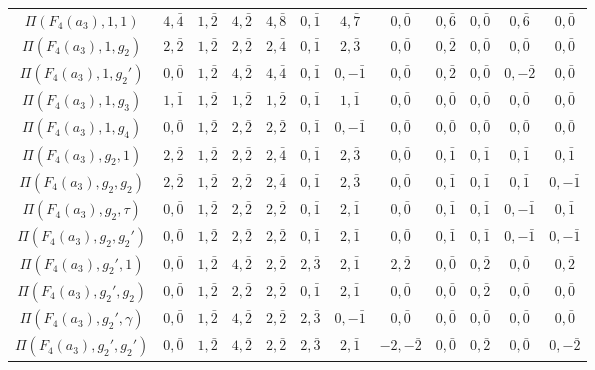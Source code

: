 \begin{table}[!ht]
\begin{adjustbox}{max width=\linewidth}
\begin{tabular}{|c|ccc|cccc|cccc|}
        $\Pi(F_4(a_3),1,1)$ & $4,\bar{4}$ & $1,\bar2$ & $4,\bar2$ & $4,\bar{8}$ & $0,\bar1$ & $4,\bar{7}$ & $0,\bar0$ & $0,\bar{6}$ & $0,\bar0$ & $0,\bar{6}$ & $0,\bar0$\\
        $\Pi(F_4(a_3),1,g_2)$ & $2,\bar2$ & $1,\bar2$ & $2,\bar2$ & $2,\bar{4}$ & $0,\bar1$ & $2,\bar{3}$ & $0,\bar0$ & $0,\bar2$ & $0,\bar0$ & $0,\bar0$ & $0,\bar0$ \\
        $\Pi(F_4(a_3),1,g_2')$ & $0,\bar0$ & $1,\bar2$ & $4,\bar2$ & $4,\bar{4}$ & $0,\bar1$ & $0,-\bar1$ & $0,\bar0$ & $0,\bar2$ & $0,\bar0$ & $0,-\bar2$ & $0,\bar0$ \\
        $\Pi(F_4(a_3),1,g_3)$ & $1,\bar1$ & $1,\bar2$ & $1,\bar2$ & $1,\bar2$ & $0,\bar1$ & $1,\bar1$ & $0,\bar0$ & $0,\bar0$ & $0,\bar0$ & $0,\bar0$ & $0,\bar0$ \\
        $\Pi(F_4(a_3),1,g_4)$ & $0,\bar0$ & $1,\bar2$ & $2,\bar2$ & $2,\bar2$ & $0,\bar1$ & $0,-\bar1$ & $0,\bar0$ & $0,\bar0$ & $0,\bar0$ & $0,\bar0$ & $0,\bar0$ \\\hdashline
        $\Pi(F_4(a_3),g_2,1)$ & $2,\bar2$ & $1,\bar2$ & $2,\bar2$ & $2,\bar{4}$ & $0,\bar1$ & $2,\bar{3}$ & $0,\bar0$ & $0,\bar1$ & $0,\bar1$ & $0,\bar1$ & $0,\bar1$ \\
        $\Pi(F_4(a_3),g_2,g_2)$ & $2,\bar2$ & $1,\bar2$ & $2,\bar2$ & $2,\bar{4}$ & $0,\bar1$ & $2,\bar{3}$ & $0,\bar0$ & $0,\bar1$ & $0,\bar1$ & $0,\bar1$ & $0,-\bar1$ \\
        $\Pi(F_4(a_3),g_2,\tau)$ & $0,\bar0$ & $1,\bar2$ & $2,\bar2$ & $2,\bar2$ & $0,\bar1$ & $2,\bar1$ & $0,\bar0$ & $0,\bar1$ & $0,\bar1$ & $0,-\bar{1}$ & $0,\bar1$ \\
        $\Pi(F_4(a_3),g_2,g_2')$ & $0,\bar0$ & $1,\bar2$ & $2,\bar2$ & $2,\bar2$ & $0,\bar1$ & $2,\bar1$ & $0,\bar0$ & $0,\bar1$ & $0,\bar1$ & $0,-\bar{1}$ & $0,-\bar{1}$ \\\hdashline
        $\Pi(F_4(a_3),g_2',1)$ & $0,\bar0$ & $1,\bar2$ & $4,\bar2$ & $2,\bar2$ & $2,\bar{3}$ & $2,\bar1$ & $2,\bar2$ & $0,\bar0$ & $0,\bar2$ & $0,\bar0$ & $0,\bar2$\\
        $\Pi(F_4(a_3),g_2',g_2)$ & $0,\bar0$ & $1,\bar2$ & $2,\bar2$ & $2,\bar2$ & $0,\bar1$ & $2,\bar1$ & $0,\bar0$ & $0,\bar0$ & $0,\bar2$ & $0,\bar0$ & $0,\bar0$\\
        $\Pi(F_4(a_3),g_2',\gamma)$ & $0,\bar0$ & $1,\bar2$ & $4,\bar2$ & $2,\bar2$ & $2,\bar{3}$ & $0,-\bar{1}$ & $0,\bar0$ & $0,\bar0$ & $0,\bar0$ & $0,\bar0$ & $0,\bar0$\\
        $\Pi(F_4(a_3),g_2',g_2')$ & $0,\bar0$ & $1,\bar2$ & $4,\bar2$ & $2,\bar2$ & $2,\bar{3}$ & $2,\bar1$ & $-2,-\bar2$ & $0,\bar0$ & $0,\bar2$ & $0,\bar0$ & $0,-\bar2$\\

\end{tabular}
\end{adjustbox}
\end{table}
